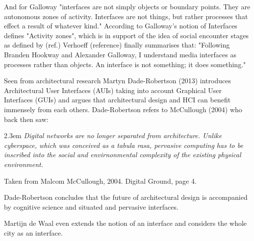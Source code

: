 And for Galloway "interfaces are not simply objects or boundary points. They are autonomous zones of activity. Interfaces are not things, but rather processes that effect a result of whatever kind."
According to Galloway's notion of Interfaces defines "Activity zones", which is in support of the idea of social encounter stages as defined by (ref.) 
Verhoeff (reference) finally summarises that: "Following Branden Hookway and Alexander Galloway, I understand media interfaces as processes rather than objects. An interface is not something; it does something."


Seen from architectural research Martyn Dade-Robertson (2013) introduces Architectural User Interfaces (AUIs) taking into account Graphical User Interfaces (GUIs) and argues that architectural design and HCI can benefit immensely from each others.
Dade-Robertson refers to McCullough (2004) who back then saw:

\begin{singlespace}
	\leftskip2.3em
		\rightskip\leftskip
\textit{\small Digital networks are no longer separated from architecture. Unlike cyberspace, which was conceived as a tabula rasa, pervasive computing has to be inscribed into the social and envirnonmental complexity of the existing physical environment.} 

\small Taken from Malcom McCullough, 2004. Digital Ground, page 4.
\end{singlespace}

Dade-Robertson concludes that the future of architectural design is accompanied by cognitive science and situated and pervasive interfaces.

Martijn de Waal even extends the notion of an interface and considers the whole city as an interface.

